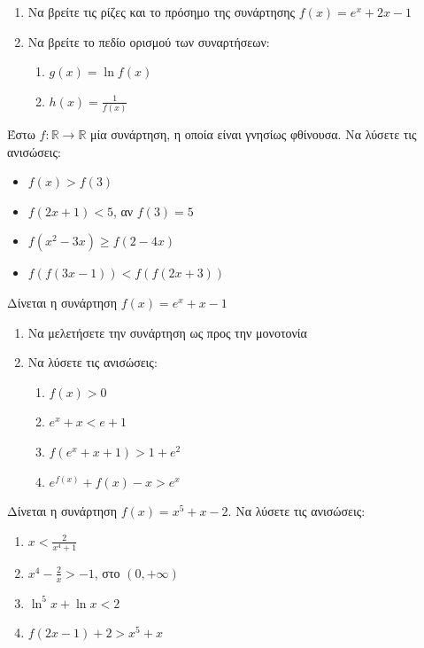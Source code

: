 \documentclass{presentation}
\begin{document}
\begin{askisi}
      \begin{enumerate}
            \item Να βρείτε τις ρίζες και το πρόσημο της συνάρτησης $f(x)=e^x+2x-1$ \pause
            \item Να βρείτε το πεδίο ορισμού των συναρτήσεων:
                  \begin{enumerate}
                        \item $g(x)=\ln f(x)$ \pause
                        \item $h(x)=\frac{1}{f(x)}$
                  \end{enumerate}
      \end{enumerate}
\end{askisi}

\begin{askisi}
      Έστω $f:\mathbb{R}\to\mathbb{R}$ μία συνάρτηση, η οποία είναι γνησίως φθίνουσα. Να λύσετε τις ανισώσεις:
      \begin{itemize}
            \item $f(x)>f(3)$
            \item $f(2x+1)<5$, αν $f(3)=5$
            \item $f(x^2-3x)\ge f(2-4x)$
            \item $f\left(f(3x-1)\right)<f\left(f(2x+3)\right)$
      \end{itemize}
\end{askisi}

\begin{askisi}
      Δίνεται η συνάρτηση $f(x)=e^x+x-1$
      \begin{enumerate}
            \item Να μελετήσετε την συνάρτηση ως προς την μονοτονία \pause
            \item Να λύσετε τις ανισώσεις:
                  \begin{enumerate}
                        \item $f(x)>0$ \pause
                        \item $e^x+x<e+1$ \pause
                        \item $f(e^x+x+1)>1+e^2$ \pause
                        \item $e^{f(x)}+f(x)-x>e^x$
                  \end{enumerate}
      \end{enumerate}
\end{askisi}

\begin{askisi}
      Δίνεται η συνάρτηση $f(x)=x^5+x-2$. Να λύσετε τις ανισώσεις:
      \begin{enumerate}
            \item $x<\frac{2}{x^4+1}$ \pause
            \item $x^4-\frac{2}{x}>-1$, στο $(0,+\infty)$ \pause
            \item $\ln^5 x+\ln x<2$ \pause
            \item $f(2x-1)+2>x^5+x$
      \end{enumerate}
\end{askisi}
\end{document}

